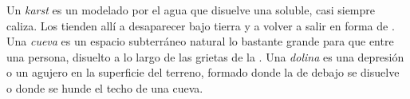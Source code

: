 \begin{definition}\label{def:g9:landforms:karst}
Un \emph{karst} es un  modelado por el agua que
disuelve una  soluble, casi siempre caliza. Los  tienden allí a
desaparecer bajo tierra y a volver a salir en forma de . Una
\emph{cueva} es un espacio subterráneo natural lo bastante
grande para que entre una persona, disuelto a lo largo de las grietas de
la . Una \emph{dolina} es una depresión o un agujero en
la superficie del terreno, formado donde la  de debajo se disuelve o
donde se hunde el techo de una cueva.
\end{definition}

